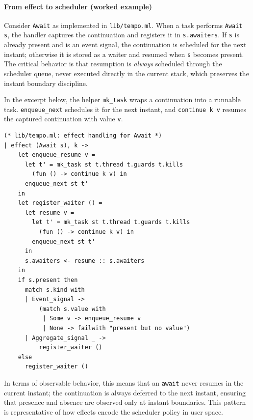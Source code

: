 \paragraph{From effect to scheduler (worked example)}
Consider \texttt{Await} as implemented in \texttt{lib/tempo.ml}. When a task
performs \texttt{Await s}, the handler captures the continuation and registers
it in \texttt{s.awaiters}. If \texttt{s} is already present and is an event
signal, the continuation is scheduled for the next instant; otherwise it is
stored as a waiter and resumed when \texttt{s} becomes present. The critical
behavior is that resumption is \emph{always} scheduled through the scheduler
queue, never executed directly in the current stack, which preserves the
instant boundary discipline.

In the excerpt below, the helper \texttt{mk\_task} wraps a continuation into a
runnable task. \texttt{enqueue\_next} schedules it for the next instant, and
\texttt{continue k v} resumes the captured continuation with value \texttt{v}.

\begin{lstlisting}[style=tempo]
(* lib/tempo.ml: effect handling for Await *)
| effect (Await s), k ->
    let enqueue_resume v =
      let t' = mk_task st t.thread t.guards t.kills
        (fun () -> continue k v) in
      enqueue_next st t'
    in
    let register_waiter () =
      let resume v =
        let t' = mk_task st t.thread t.guards t.kills
          (fun () -> continue k v) in
        enqueue_next st t'
      in
      s.awaiters <- resume :: s.awaiters
    in
    if s.present then
      match s.kind with
      | Event_signal ->
          (match s.value with
           | Some v -> enqueue_resume v
           | None -> failwith "present but no value")
      | Aggregate_signal _ ->
          register_waiter ()
    else
      register_waiter ()
\end{lstlisting}

In terms of observable behavior, this means that an \texttt{await} never
resumes in the current instant; the continuation is always deferred to the
next instant, ensuring that presence and absence are observed only at instant
boundaries. This pattern is representative of how effects encode the scheduler
policy in user space.

